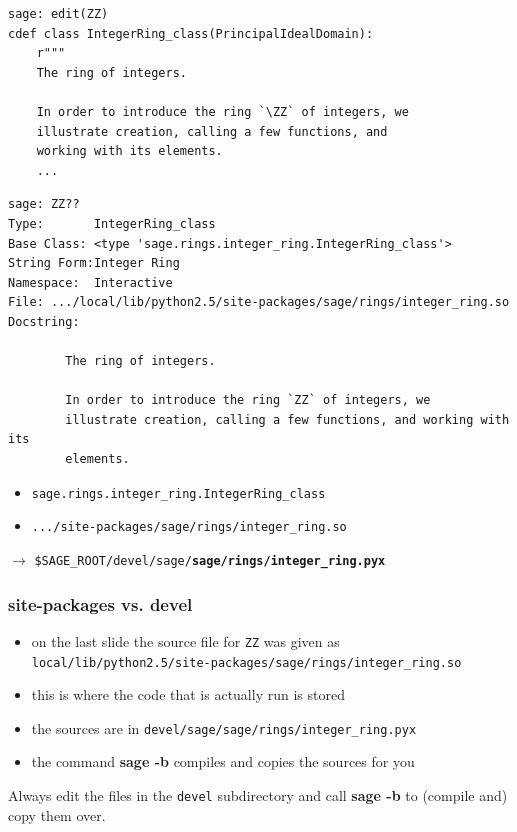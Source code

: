 \documentclass[11pt,blackandwhite]{beamer}
\renewcommand{\emph}[1]{{\color{black}\bf #1}}
\begin{document}
\begin{frame}
\begin{scriptsize}
\begin{lstlisting}
sage: edit(ZZ)
cdef class IntegerRing_class(PrincipalIdealDomain):
    r"""
    The ring of integers.

    In order to introduce the ring `\ZZ` of integers, we
    illustrate creation, calling a few functions, and 
    working with its elements.
    ...
\end{lstlisting}
\end{scriptsize}

\framebreak

\begin{tiny}
\begin{lstlisting}
sage: ZZ??
Type:       IntegerRing_class
Base Class: <type 'sage.rings.integer_ring.IntegerRing_class'>
String Form:Integer Ring
Namespace:  Interactive
File: .../local/lib/python2.5/site-packages/sage/rings/integer_ring.so
Docstring:

        The ring of integers.

        In order to introduce the ring `ZZ` of integers, we
        illustrate creation, calling a few functions, and working with its
        elements.

\end{lstlisting}
\end{tiny}

\begin{itemize}
 \item \texttt{sage.rings.integer\_ring.IntegerRing\_class}
 \item \texttt{.../site-packages/sage/rings/integer\_ring.so}
\end{itemize}
$\longrightarrow$
\texttt{\$SAGE\_ROOT/devel/sage/\emph{sage/rings/integer\_ring.pyx}}
\end{frame}

\begin{frame}
\frametitle{site-packages vs. devel}
\begin{itemize}
 \item on the last slide the source file for \texttt{ZZ} was given as
{\scriptsize\texttt{
local/lib/python2.5/site-packages/sage/rings/integer\_ring.so }}
 \item this is where the code that is actually run is stored
 \item the sources are in \texttt{devel/sage/sage/rings/integer\_ring.pyx}
 \item the command \emph{sage -b} compiles and copies the sources for you
\end{itemize}

Always edit the files in the \texttt{devel} subdirectory and call \emph{sage
-b} to (compile and) copy them over.
\end{frame}
\end{document}

